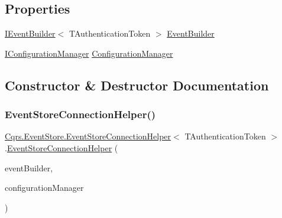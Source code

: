 \subsection*{Properties}
\begin{DoxyCompactItemize}
\item 
\hyperlink{interfaceCqrs_1_1EventStore_1_1IEventBuilder}{I\+Event\+Builder}$<$ T\+Authentication\+Token $>$ \hyperlink{classCqrs_1_1EventStore_1_1EventStoreConnectionHelper_a0658657c13dd7edfaca4837e39fd86dd}{Event\+Builder}
\item 
\hyperlink{interfaceCqrs_1_1Configuration_1_1IConfigurationManager}{I\+Configuration\+Manager} \hyperlink{classCqrs_1_1EventStore_1_1EventStoreConnectionHelper_aa518bbaa1cd7d75a57429c3cf4dd4f96}{Configuration\+Manager}
\end{DoxyCompactItemize}


\subsection{Constructor \& Destructor Documentation}
\mbox{\label{classCqrs_1_1EventStore_1_1EventStoreConnectionHelper_ac9d232e255275c70aee4465b08e7fd79}} 
\subsubsection{\texorpdfstring{Event\+Store\+Connection\+Helper()}{EventStoreConnectionHelper()}}
{\footnotesize\ttfamily \hyperlink{classCqrs_1_1EventStore_1_1EventStoreConnectionHelper}{Cqrs.\+Event\+Store.\+Event\+Store\+Connection\+Helper}$<$ T\+Authentication\+Token $>$.\hyperlink{classCqrs_1_1EventStore_1_1EventStoreConnectionHelper}{Event\+Store\+Connection\+Helper} (\begin{DoxyParamCaption}\item[{\hyperlink{interfaceCqrs_1_1EventStore_1_1IEventBuilder}{I\+Event\+Builder}$<$ T\+Authentication\+Token $>$}]{event\+Builder,  }\item[{\hyperlink{interfaceCqrs_1_1Configuration_1_1IConfigurationManager}{I\+Configuration\+Manager}}]{configuration\+Manager }\end{DoxyParamCaption})}



